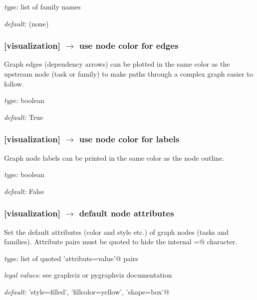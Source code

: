 \begin{myitemize}
    \item {\em type:} list of family names
    \item {\em default:} (none)
\end{myitemize}

\subsubsection[use node color for edges]{[visualization] $\rightarrow$ use node color for edges}

Graph edges (dependency arrows) can be plotted in the same color
as the upstream node (task or family) to make paths through a complex
graph easier to follow.

\begin{myitemize}
    \item {\em type:} boolean
    \item {\em default:} True
\end{myitemize}

\subsubsection[use node color for labels]{[visualization] $\rightarrow$ use node color for labels}

Graph node labels can be printed in the same color as the node outline.

\begin{myitemize}
    \item {\em type:} boolean
    \item {\em default:} False
\end{myitemize}


\subsubsection[default node attributes]{[visualization] $\rightarrow$ default node attributes}

Set the default attributes (color and style etc.) of graph nodes (tasks and families).
Attribute pairs must be quoted to hide the internal \lstinline@=@ character.

\begin{myitemize}
    \item {\em type:} list of quoted \lstinline@'attribute=value'@ pairs
    \item {\em legal values:} see graphviz or pygraphviz documentation
    \item {\em default:} \lstinline@'style=filled', 'fillcolor=yellow', 'shape=box'@
\end{myitemize}

